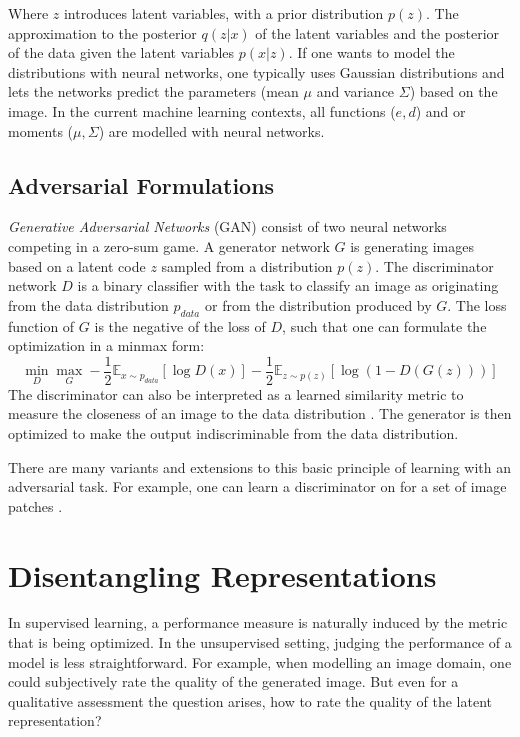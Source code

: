 		Where $z$ introduces latent variables, with a prior distribution $p(z)$. The approximation to the posterior $q(z|x)$ of the latent variables and the posterior of the data given the latent variables $p(x|z)$. If one wants to model the distributions with neural networks, one typically uses Gaussian distributions and lets the networks predict the parameters (mean $\mu$ and variance $\Sigma$) based on the image.
		In the current machine learning contexts, all functions ($e, d$) and or moments ($\mu, \Sigma$) are modelled with neural networks.

	\subsection{Adversarial Formulations}\label{sec:adversarial}
		\textit{Generative Adversarial Networks} (GAN) \cite{goodfellow14gan} consist of two neural networks competing in a zero-sum game. A generator network $G$ is generating images based on a latent code $z$ sampled from a distribution $p(z)$. The discriminator network $D$ is a binary classifier with the task to classify an image as originating from the data distribution $p_{data}$ or from the distribution produced by $G$. The loss function of $G$ is the negative of the loss of $D$, such that one can formulate the optimization in a minmax form:
		\begin{equation}
				\min_D \max_G - \frac{1}{2} \mathds{E}_{x\sim p_{data}}[\log D(x)] - \frac{1}{2}\mathds{E}_{z\sim p(z)}[\log (1-D(G(z)))]
		\end{equation}
		The discriminator can also be interpreted as a learned similarity metric to measure the closeness of an image to the data distribution \cite{larsen15vaegan}. The generator is then optimized to make the output indiscriminable from the data distribution.

		There are many variants and extensions to this basic principle of learning with an adversarial task. For example, one can learn a discriminator on for a set of image patches \cite{isola17image2image}. 

\section{Disentangling Representations}\label{sec:disentangled}
	In supervised learning, a performance measure is naturally induced by the metric that is being optimized. In the unsupervised setting, judging the performance of a model is less straightforward. For example, when modelling an image domain, one could subjectively rate the quality of the generated image. But even for a qualitative assessment the question arises, how to rate the quality of the latent representation?

